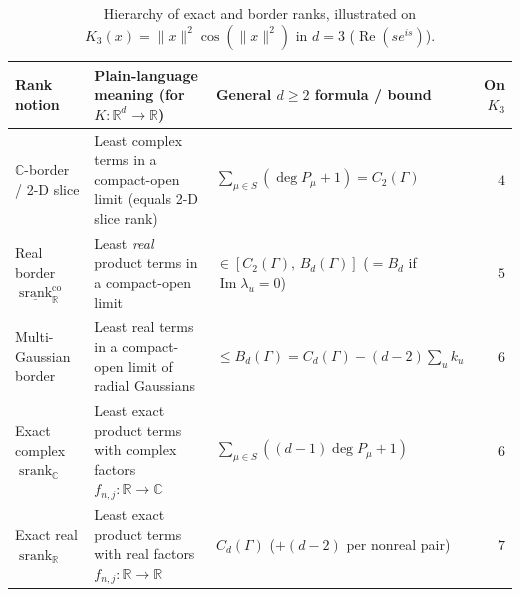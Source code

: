\documentclass[11pt,a4paper]{article}
\theoremstyle{plain}
\theoremstyle{definition}
\newcommand{\R}{\mathbb{R}}
\newcommand{\C}{\mathbb{C}}
\DeclareMathOperator{\RePart}{Re}
\DeclareMathOperator{\ImPart}{Im}
\DeclareMathOperator{\srank}{srank}
\begin{document}
\begin{table}[t]
\centering
\caption{Hierarchy of exact and border ranks, illustrated on $K_3(x) = \|x\|^2\cos(\|x\|^2)$ in $d = 3$ ($\RePart(s e^{is})$).}\label{tab:rank_levels}
\smallskip
{\scriptsize\setlength{\tabcolsep}{3.3pt}
\begin{tabular}{@{}l>{\raggedright\arraybackslash}p{5.9cm}lr@{}}
\toprule
Rank notion & Plain-language meaning (for $K : \R^d \to \R$) & General $d \ge 2$ formula / bound & On $K_3$ \\
\midrule
$\C$-border / 2-D slice & Least complex terms in a compact-open limit (equals 2-D slice rank) & $\sum_{\mu \in S} (\deg P_\mu + 1) = C_2(\Gamma)$ & $4$ \\
Real border $\underline{\srank}_{\R}^{\mathrm{co}}$ & Least \emph{real} product terms in a compact-open limit & $\in [C_2(\Gamma),\, B_d(\Gamma)]$ ($= B_d$ if $\ImPart\lambda_u{=}0$) & $5$ \\
Multi-Gaussian border & Least real terms in a compact-open limit of radial Gaussians & $\le B_d(\Gamma) = C_d(\Gamma) - (d-2)\sum_u k_u$ & $6$ \\
Exact complex $\srank_{\C}$ & Least exact product terms with complex factors $f_{n,j} : \R \to \C$ & $\sum_{\mu \in S} ((d-1)\deg P_\mu + 1)$ & $6$ \\
Exact real $\srank_{\R}$ & Least exact product terms with real factors $f_{n,j} : \R \to \R$ & $C_d(\Gamma)$ ($+ (d-2)$ per nonreal pair) & $7$ \\
\bottomrule
\end{tabular}}
\end{table}
\end{document}
